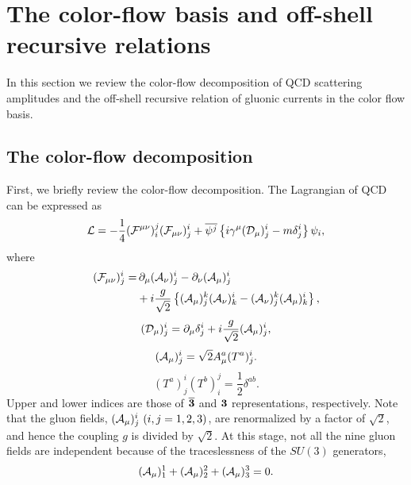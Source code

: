 \section{The color-flow basis and off-shell recursive relations}
\label{review}
In this section we review the color-flow decomposition\cite{fabio} of QCD scattering amplitudes and the off-shell recursive relation\cite{berends} of gluonic currents in the color flow basis.
\subsection{The color-flow decomposition}
\label{colorflow}
First, we briefly review the color-flow decomposition. The Lagrangian of
QCD can be expressed as
\begin{equation}
 {\cal L}=-\frac{1}{4}({\cal F}^{\mu\nu})^j_i({\cal F}_{\mu\nu})^i_j
+\overline{\psi^j}\left\{i\gamma^{\mu}({\cal D}_{\mu})^i_j
-m\delta^i_j\right\}\psi_i,\label{lagrangian}
\end{equation}
where
\begin{align}
 ({\cal F}_{\mu\nu})^i_j=&\,\partial_{\mu}({\cal A}_{\nu})^i_j
-\partial_{\nu}({\cal A}_{\mu})^i_j \nonumber\\
&+i\frac{g}{\sqrt{2}}\left\{({\cal A}_{\mu})^k_j
({\cal A}_{\nu})^i_k-({\cal A}_{\nu})^k_j
({\cal A}_{\mu})^i_k\right\},
  \end{align}
\begin{equation}
 ({\cal
  D}_{\mu})^i_j=\partial_{\mu}\delta^i_j+i\frac{g}{\sqrt{2}}({\cal
  A}_{\mu})^i_j,
\end{equation}
\begin{equation}
 ({\cal A}_{\mu})^i_j=\sqrt{2}A_{\mu}^a(T^a)^i_j.
\end{equation}
\begin{equation}
 (T^a)^i_j(T^b)^j_i = \frac{1}{2}\delta^{ab}.
\end{equation}
Upper and lower indices are those of ${\bf \overline{3}}$ and ${\bf 3}$
representations, respectively. Note that the gluon fields, $({\cal
A}_{\mu})^i_j\,\,(i,j=1, 2, 3)$, are renormalized by a
factor of $\sqrt{2}$, and hence the coupling $g$ is divided by
$\sqrt{2}$. At this stage, not all the nine gluon fields are independent
because of  the traceslessness of the $SU(3)$ generators,
\begin{equation}
({\cal A}_{\mu})^1_1 + ({\cal A}_{\mu})^2_2 + ({\cal A}_{\mu})^3_3 = 0.
\end{equation}

